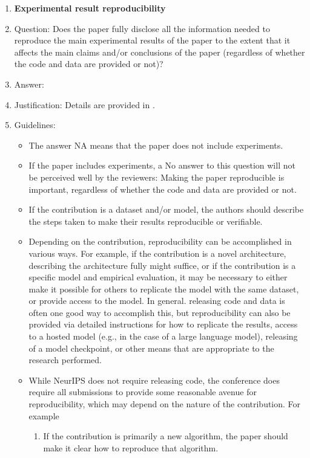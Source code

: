 \documentclass{article}
\begin{document}
{\begin{enumerate}
    \item {\bf Experimental result reproducibility}
    \item[] Question: Does the paper fully disclose all the information needed to reproduce the main experimental results of the paper to the extent that it affects the main claims and/or conclusions of the paper (regardless of whether the code and data are provided or not)?
    \item[] Answer: \answerYes{} %
    \item[] Justification: Details are provided in .
    \item[] Guidelines:
    \begin{itemize}
        \item The answer NA means that the paper does not include experiments.
        \item If the paper includes experiments, a No answer to this question will not be perceived well by the reviewers: Making the paper reproducible is important, regardless of whether the code and data are provided or not.
        \item If the contribution is a dataset and/or model, the authors should describe the steps taken to make their results reproducible or verifiable. 
        \item Depending on the contribution, reproducibility can be accomplished in various ways. For example, if the contribution is a novel architecture, describing the architecture fully might suffice, or if the contribution is a specific model and empirical evaluation, it may be necessary to either make it possible for others to replicate the model with the same dataset, or provide access to the model. In general. releasing code and data is often one good way to accomplish this, but reproducibility can also be provided via detailed instructions for how to replicate the results, access to a hosted model (e.g., in the case of a large language model), releasing of a model checkpoint, or other means that are appropriate to the research performed.
        \item While NeurIPS does not require releasing code, the conference does require all submissions to provide some reasonable avenue for reproducibility, which may depend on the nature of the contribution. For example
        \begin{enumerate}
            \item If the contribution is primarily a new algorithm, the paper should make it clear how to reproduce that algorithm.

\end{enumerate}
\end{itemize}
\end{enumerate}}
\end{document}
